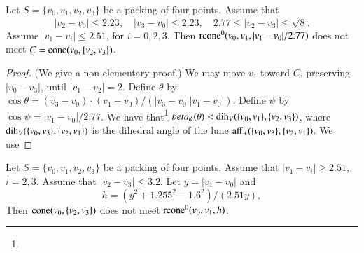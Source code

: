 \begin{tarskidata}

\begin{tarski}

\begin{lemma}
Let $S=\{v_0,v_1,v_2,v_3\}$ be a packing of four points.
Assume that
   $$
   |v_2-v_0|\le 2.23,\quad |v_3-v_0|\le 2.23,\quad 2.77\le |v_2-v_3|\le\sqrt8.
   $$
Assume $|v_1-v_i|\le 2.51$, for $i=0,2,3$.
Then ${\operatorname{rcone}}^0(v_0,v_1,|v_1-v_0|/2.77)$ does not meet
$C={\operatorname{cone}}(v_0,\{v_2,v_3\})$.
\end{lemma}


\begin{proof} (We give a non-elementary proof.)  We may
move $v_1$ toward $C$, preserving $|v_0-v_3|$, until $|v_1-v_2|=2$.
Define $\theta$ by $\cos\theta = (v_3-v_0)\cdot (v_1-v_0)/(|v_3-v_0||v_1-v_0|)$.
Define $\psi$ by $\cos\psi = |v_1-v_0|/2.77$.
We have that\footnote{}
    $beta_\psi(\theta) < \operatorname{dih}_V(\{v_0,v_1\},\{v_2,v_3\})$,
where $\operatorname{dih}_V(\{v_0,v_3\},\{v_2,v_1\})$ is the dihedral angle 
of the lune ${\operatorname{aff}}_+(\{v_0,v_3\},\{v_2,v_1\})$.   We use
\end{proof}
\end{tarski}




\begin{tarski}

\begin{lemma}
Let $S=\{v_0,v_1,v_2,v_3\}$ be a packing of four points.
Assume that
$|v_1-v_i|\ge 2.51$, $i=2,3$.
Assume that $|v_2-v_3|\le 3.2$.
Let $y = |v_1-v_0|$ and 
$$
  h=(y^2+1.255^2-1.6^2)/(2.51 y),
$$
Then ${\operatorname{cone}}(v_0,\{v_2,v_3\})$ does not meet
${\operatorname{rcone}}^0(v_0,v_1,h)$.
\end{lemma}



\end{tarski}
\end{tarskidata}
